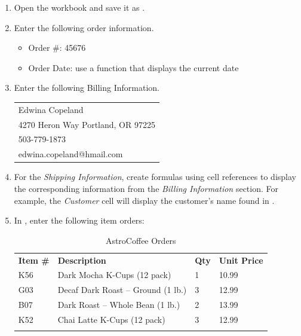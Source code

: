\begin{enumbox}
	\begin{enumerate}
		\item Open the  workbook and save it as .
		\item Enter the following order information.
	
		\begin{itemize}
			\item Order \#: 45676
			\item Order Date: use a function that displays the current date
		\end{itemize}
	
		\item Enter the following Billing Information.
	
		\begin{tabular}{l}
			\hline
			Edwina Copeland\\
			4270 Heron Way Portland, OR 97225\\
			503-779-1873\\
			edwina.copeland@hmail.com\\
			\hline
		\end{tabular}
		
		\item For the \textit{Shipping Information}, create formulas using cell references to display the corresponding information from the \textit{Billing Information} section. For example, the \textit{Customer} cell will display the customer's name found in .
		\item In , enter the following item orders:
		
		{\small
			\begin{longtable}{p{0.4in}p{2.10in}p{0.25in}p{0.5in}} %
				\textbf{Item \#} & \textbf{Description} & \textbf{Qty} & \textbf{Unit Price}\endhead
				\hline \\
				K56 & Dark Mocha K-Cups (12 pack) & 1 & 10.99\\
				G03 & Decaf Dark Roast – Ground (1 lb.) & 3 & 12.99\\
				B07 & Dark Roast – Whole Bean (1 lb.) & 2 & 13.99\\
				K52 & Chai Latte K-Cups (12 pack) & 3 & 12.99\\
				\caption{AstroCoffee Orders}
				\label{03:tab02}
			\end{longtable}
		}
		

\end{enumerate}
\end{enumbox}
